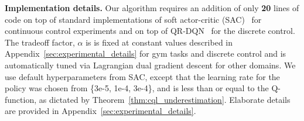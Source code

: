 \textbf{Implementation details.} Our algorithm requires an addition of only \textbf{20} lines of code on top of standard implementations of soft actor-critic (SAC)~\citep{haarnoja} for continuous control experiments and on top of QR-DQN~\citep{dabney2018distributional} for the discrete control. The tradeoff factor, $\alpha$
is is fixed at constant values described in Appendix~\ref{sec:experimental_details} for gym tasks and discrete control and is automatically tuned via Lagrangian dual gradient descent for other domains. We use default hyperparameters from SAC, except that the learning rate for the policy was chosen from \{3e-5, 1e-4, 3e-4\}, and is less than or equal to the Q-function, as dictated by Theorem~\ref{thm:cql_underestimation}. 
Elaborate details are provided in Appendix~\ref{sec:experimental_details}.  
